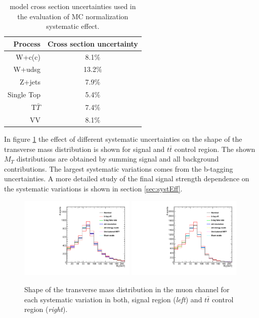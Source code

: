 \begin{table}[!htb]
\begin{center}
   \begin{tabular} {r c} \hline \hline
        Process         & Cross section uncertainty \\
        \hline
        W+c(c)          & 8.1$\%$ \\
        W+udsg          & 13.2$\%$ \\
        Z+jets          & 7.9$\%$ \\
        Single Top      & 5.4$\%$ \\
        T$\bar{T}$      & 7.4$\%$ \\
        VV              & 8.1$\%$ \\
        \hline\hline
   \end{tabular}
\caption{
 model cross section uncertainties used in the evaluation of MC normalization systematic effect.}
\label{tab:SMunc}
\end{center}
\end{table}

In figure \ref{fig:shapeVar} the effect of different systematic uncertainties on the shape of the transverse mass distribution is shown for signal and $t\bar{t}$ control region. The shown $M_T$ distributions are obtained by summing signal and all background contributions. The largest systematic variations comes from the b-tagging uncertainties. A more detailed study of the final signal strength dependence on the systematic variations is shown in section \ref{sec:systEff}.

\begin{figure}[htbp]
	\centering
		\includegraphics[width=0.49\textwidth]{Figures/syst_Wbb_var.pdf}
		\includegraphics[width=0.49\textwidth]{Figures/syst_TT_var.pdf}
	\caption[Shape of the transverse mass distribution for each systematic variation in both, signal region and $t\bar{t}$ control region.]{Shape of the transverse mass distribution in the muon channel for each systematic variation in both, signal region (\textit{left}) and $t\bar{t}$ control region (\textit{right}).}
	\label{fig:shapeVar}
\end{figure}

